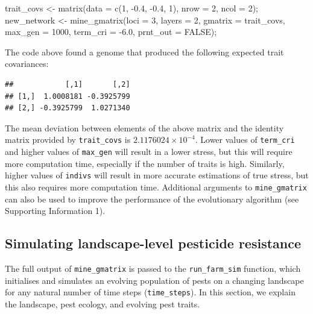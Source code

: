 \documentclass[
]{article}
\newenvironment{Shaded}{\begin{snugshade}}{\end{snugshade}}
\newcommand{\AttributeTok}[1]{\textcolor[rgb]{0.77,0.63,0.00}{#1}}
\newcommand{\ConstantTok}[1]{\textcolor[rgb]{0.00,0.00,0.00}{#1}}
\newcommand{\DecValTok}[1]{\textcolor[rgb]{0.00,0.00,0.81}{#1}}
\newcommand{\FloatTok}[1]{\textcolor[rgb]{0.00,0.00,0.81}{#1}}
\newcommand{\FunctionTok}[1]{\textcolor[rgb]{0.00,0.00,0.00}{#1}}
\newcommand{\NormalTok}[1]{#1}
\newcommand{\OtherTok}[1]{\textcolor[rgb]{0.56,0.35,0.01}{#1}}
\newcommand{\SpecialCharTok}[1]{\textcolor[rgb]{0.00,0.00,0.00}{#1}}
\begin{document}
\begin{Shaded}
\begin{Highlighting}[]
\NormalTok{trait\_covs  }\OtherTok{\textless{}{-}} \FunctionTok{matrix}\NormalTok{(}\AttributeTok{data =} \FunctionTok{c}\NormalTok{(}\DecValTok{1}\NormalTok{, }\SpecialCharTok{{-}}\FloatTok{0.4}\NormalTok{, }\SpecialCharTok{{-}}\FloatTok{0.4}\NormalTok{, }\DecValTok{1}\NormalTok{), }\AttributeTok{nrow =} \DecValTok{2}\NormalTok{, }\AttributeTok{ncol =} \DecValTok{2}\NormalTok{);}
\NormalTok{new\_network }\OtherTok{\textless{}{-}} \FunctionTok{mine\_gmatrix}\NormalTok{(}\AttributeTok{loci =} \DecValTok{3}\NormalTok{, }\AttributeTok{layers =} \DecValTok{2}\NormalTok{, }\AttributeTok{gmatrix =}\NormalTok{ trait\_covs, }
                            \AttributeTok{max\_gen =} \DecValTok{1000}\NormalTok{, }\AttributeTok{term\_cri =} \SpecialCharTok{{-}}\FloatTok{6.0}\NormalTok{, }\AttributeTok{prnt\_out =} \ConstantTok{FALSE}\NormalTok{);}
\end{Highlighting}
\end{Shaded}

The code above found a genome that produced the following expected trait covariances:

\begin{verbatim}
##            [,1]       [,2]
## [1,]  1.0008181 -0.3925799
## [2,] -0.3925799  1.0271340
\end{verbatim}

The mean deviation between elements of the above matrix and the identity matrix provided by \texttt{trait\_covs} is \ensuremath{2.1176024\times 10^{-4}}.
Lower values of \texttt{term\_cri} and higher values of \texttt{max\_gen} will result in a lower stress, but this will require more computation time, especially if the number of traits is high.
Similarly, higher values of \texttt{indivs} will result in more accurate estimations of true stress, but this also requires more computation time.
Additional arguments to \texttt{mine\_gmatrix} can also be used to improve the performance of the evolutionary algorithm (see Supporting Information 1).

\hypertarget{simulating}{%
\subsection{Simulating landscape-level pesticide resistance}\label{simulating}}

The full output of \texttt{mine\_gmatrix} is passed to the \texttt{run\_farm\_sim} function, which initialises and simulates an evolving population of pests on a changing landscape for any natural number of time steps (\texttt{time\_steps}).
In this section, we explain the landscape, pest ecology, and evolving pest traits.
\end{document}

